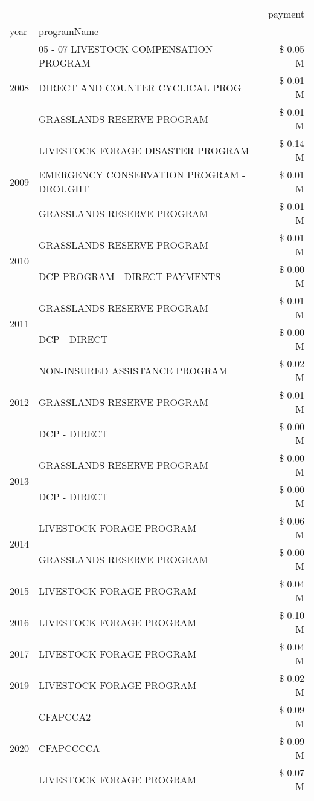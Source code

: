 \begin{tabular}{llr}
\toprule
 &  & payment \\
year & programName &  \\
\midrule
\multirow[t]{3}{*}{2008} & 05 - 07 LIVESTOCK COMPENSATION PROGRAM & \$ 0.05 M \\
 & DIRECT AND COUNTER CYCLICAL PROG & \$ 0.01 M \\
 & GRASSLANDS RESERVE PROGRAM & \$ 0.01 M \\
\cline{1-3}
\multirow[t]{3}{*}{2009} & LIVESTOCK FORAGE DISASTER  PROGRAM & \$ 0.14 M \\
 & EMERGENCY CONSERVATION PROGRAM - DROUGHT & \$ 0.01 M \\
 & GRASSLANDS RESERVE PROGRAM & \$ 0.01 M \\
\cline{1-3}
\multirow[t]{2}{*}{2010} & GRASSLANDS RESERVE PROGRAM & \$ 0.01 M \\
 & DCP PROGRAM - DIRECT PAYMENTS & \$ 0.00 M \\
\cline{1-3}
\multirow[t]{2}{*}{2011} & GRASSLANDS RESERVE PROGRAM & \$ 0.01 M \\
 & DCP - DIRECT & \$ 0.00 M \\
\cline{1-3}
\multirow[t]{3}{*}{2012} & NON-INSURED ASSISTANCE PROGRAM & \$ 0.02 M \\
 & GRASSLANDS RESERVE PROGRAM & \$ 0.01 M \\
 & DCP - DIRECT & \$ 0.00 M \\
\cline{1-3}
\multirow[t]{2}{*}{2013} & GRASSLANDS RESERVE PROGRAM & \$ 0.00 M \\
 & DCP - DIRECT & \$ 0.00 M \\
\cline{1-3}
\multirow[t]{2}{*}{2014} & LIVESTOCK FORAGE PROGRAM & \$ 0.06 M \\
 & GRASSLANDS RESERVE PROGRAM & \$ 0.00 M \\
\cline{1-3}
2015 & LIVESTOCK FORAGE PROGRAM & \$ 0.04 M \\
\cline{1-3}
2016 & LIVESTOCK FORAGE PROGRAM                      & \$ 0.10 M \\
\cline{1-3}
2017 & LIVESTOCK FORAGE PROGRAM & \$ 0.04 M \\
\cline{1-3}
2019 & LIVESTOCK FORAGE PROGRAM & \$ 0.02 M \\
\cline{1-3}
\multirow[t]{3}{*}{2020} & CFAPCCA2 & \$ 0.09 M \\
 & CFAPCCCCA & \$ 0.09 M \\
 & LIVESTOCK FORAGE PROGRAM & \$ 0.07 M \\
\cline{1-3}
\bottomrule
\end{tabular}
